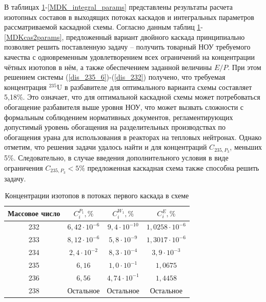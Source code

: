 В таблицах \ref{MDKcas1params}-\ref{MDK_integral_params} представлены результаты расчета изотопных составов в выходящих потоках каскадов и интегральных параметров рассматриваемой каскадной схемы. Согласно данным таблиц \ref{MDKcas1params}-\ref{MDKcas2params}, предложенный вариант двойного каскада принципиально позволяет решить поставленную задачу -- получить товарный НОУ требуемого качества с одновременным удовлетворением всех ограничений на концентрации чётных изотопов в нём, а также обеспечением заданной величины $E/P$. При этом решением системы (\ref{dis_235_6})-(\ref{dis_232}) получено, что требуемая концентрация $^{235}$U в разбавителе для оптимального варианта схемы составляет 5,18\%. Это означает, что для оптимальной каскадной схемы может потребоваться обогащение разбавителя выше уровня НОУ, что может вызвать сложности с формальным соблюдением нормативных документов, регламентирующих допустимый уровень обогащения на разделительных производствах по обогащения урана для использования в реакторах на тепловых нейтронах. Однако отметим, что решения задачи удалось найти и для концентраций $C_{235,{P_3}}$, меньших 5\%. Следовательно, в случае введения дополнительного условия в виде ограничения $C_{235,{P_3}} < 5\%$ предложенная каскадная схема также способна решить задачу. 

\begin{table}[ht]
    \centering
    \caption{Концентрации изотопов в потоках первого каскада в схеме}\label{MDKcas1params}
    \begin{tabular}{|c|c|c|c|}
        \hline Массовое число & $C_{i}^{P_{1}}, \%$ & $C_{i}^{W_{1}}, \%$ & $C_{i}^{E}, \%$\\\hline 
        232 & $6,42\cdot10^{-6}$ & $9,4\cdot10^{-10}$ & $1,0258\cdot10^{-6}$\\
        233 & $8,12\cdot10^{-6}$ & $5,8\cdot10^{-9}$ & $1,3017\cdot10^{-6}$\\
        234 & $2,4\cdot10^{-2}$ & $8,3\cdot10^{-4}$ & $3,9\cdot10^{-3}$\\
        235 & $6,16$ & $1,0\cdot10^{-1}$ & $1,0675$\\
        236 & $6,56$ & $4,74\cdot10^{-1}$ & $1,4458$\\
        238 & Остальное & Остальное & Остальное\\
        \hline
    \end{tabular}
\end{table}


